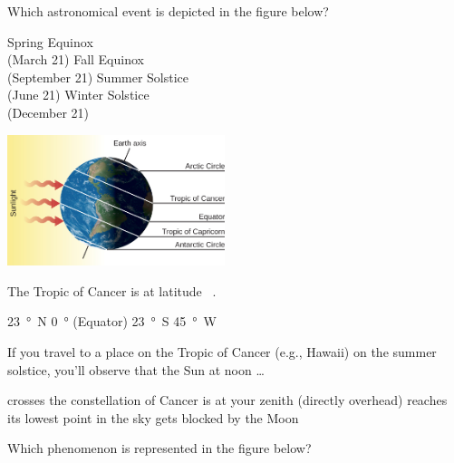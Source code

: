 \documentclass[addpoints]{exam}
\begin{document}
\begin{questions}
\question
Which astronomical event is depicted in the figure below?

\begin{minipage}{0.45\textwidth}
    \centering
    \begin{choices}
    \choice Spring Equinox\\ (March 21)
    \choice Fall Equinox\\ (September 21)
    \choice Summer Solstice\\ (June 21)
    \correctchoice Winter Solstice\\ (December 21)
    \end{choices}
\end{minipage}%
\begin{minipage}{0.5\textwidth}
    \centering
    \includegraphics[width=2.5in]{Figures/Figure4.9.jpg}
\end{minipage}
\vspace{1em}

\question
The Tropic of Cancer is at latitude \fillin[][1cm]\ .

\begin{choices}
    \correctchoice \SI{23}{\degree N}
    \choice \SI{0}{\degree} (Equator)
    \correctchoice \SI{23}{\degree S}
    \correctchoice \SI{45}{\degree W}
\end{choices}

\question
If you travel to a place on the Tropic of Cancer (e.g., Hawaii) on the summer solstice, you'll observe that the Sun at noon \ldots

\begin{choices}
    \choice crosses the constellation of Cancer
    \correctchoice is at your zenith (directly overhead)
    \choice reaches its lowest point in the sky
    \choice gets blocked by the Moon
\end{choices}

\question
Which phenomenon is represented in the figure below?
\vspace{1em}


\end{questions}
\end{document}
